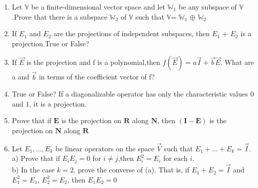 \renewcommand{\theequation}{\theenumi}
\renewcommand{\thefigure}{\theenumi}
\begin{enumerate}[label=\thesubsection.\arabic*.,ref=\thesubsection.\theenumi]

\item Let $\mathbb{V}$ be a finite-dimensional vector space and let $\mathbb{W}_1$ be any subspace of $\mathbb{V}$.Prove that there is a subspace $\mathbb{W}_2$ of $\mathbb{V}$ such that $\mathbb{V}$= $\mathbb{W}_1$ $\oplus$ $\mathbb{W}_2$
%
\\
\solution

\item %
If $E_1$ and $E_2$ are the projections of independent subspaces, then $E_1$ + $E_2$ is a projection.True or False?
%
\\
\solution

\item If $\vec{E}$ is the projection and f is a polynomial,then $f(\vec{E})=a\vec{I}+\vec{b}\vec{E}$. What are a and $\vec{b}$ in terms of the coefficient vector of f?
%
\\
\solution

\item %
True or False? If a diagonalizable operator has only the characteristic values $0$ and $1$, it is a projection.
%
\\
\solution

\item 	Prove that if $\mathbf{E}$ is the projection on $\mathbf{R}$ along $\mathbf{N}$, then $(\mathbf{I-E})$ is the projection on $\mathbf{N}$ along $\mathbf{R}$ 
%
\\
\solution

\item Let $E_1,...,E_k$ be linear operators on the space $\vec{V}$ such that $E_1+...+E_k =\vec{I}$.\\
a) Prove that if $E_iE_j = 0$ for $i\neq j$,then $E_i^2=E_i$ for each $i$.\\
b) In the case $k=2$, prove the converse of (a). That is, if $E_1+E_2=\vec{I}$ and $E_1^2 = E_1$, $E_2^2= E_2$, then $E_1E_2=0$
%
\\
\solution

\end{enumerate}
